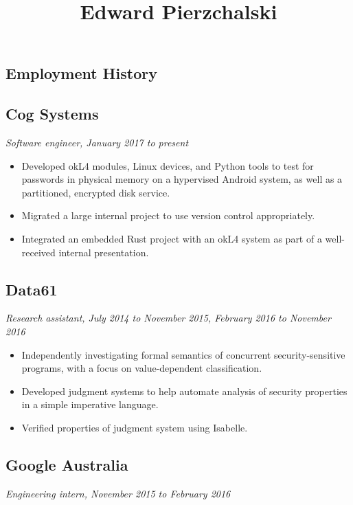 \documentclass{article}
\title{Edward Pierzchalski}
\date{}
\begin{document}
\maketitle
\vspace{-5em}

\begin{multicols*}{2}

\section*{Employment History}

\subsection*{Cog Systems}
\textit{Software engineer, January 2017 to present}

\begin{itemize}[leftmargin=12pt, itemsep=-2pt, topsep=-4pt]
 \item {
  Developed okL4 modules, Linux devices, and Python tools to test for passwords in physical memory on a hypervised Android system, as well as a partitioned, encrypted disk service.
 }
 \item {
  Migrated a large internal project to use version control appropriately.
 }
 \item {
  Integrated an embedded Rust project with an okL4 system as part of a well-received internal presentation.
 }
\end{itemize}

\subsection*{Data61}
\textit{Research assistant, July 2014 to November 2015, February 2016 to November 2016}

\begin{itemize}[leftmargin=12pt, itemsep=-2pt, topsep=-4pt]
 \item {
  Independently investigating formal semantics of concurrent security-sensitive programs, with a focus on value-dependent classification.
 }
 \item {
  Developed judgment systems to help automate analysis of security properties in a simple imperative language.
 }
 \item {
  Verified properties of judgment system using Isabelle.
 }
\end{itemize}

\subsection*{Google Australia}
\textit{Engineering intern, November 2015 to February 2016}


\end{multicols*}
\end{document}
